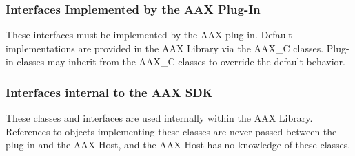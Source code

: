 \begin{DoxyRefList}
\item[Class \mbox{\hyperlink{a01869}{A\+A\+X\+\_\+\+I\+Property\+Map}} ]\label{a00844__aax_host_implementation000011}%
%
 
\item[Class \mbox{\hyperlink{a01885}{A\+A\+X\+\_\+\+I\+Transport}} ]\label{a00844__aax_host_implementation000012}%
%
 
\item[Class \mbox{\hyperlink{a01889}{A\+A\+X\+\_\+\+I\+View\+Container}} ]\label{a00844__aax_host_implementation000013}%
%

\end{DoxyRefList}\hypertarget{aax_plugin_implementation}{}\subsubsection{Interfaces Implemented by the A\+A\+X Plug-\/\+In}\label{aax_plugin_implementation}
These interfaces must be implemented by the A\+AX plug-\/in. Default implementations are provided in the A\+AX Library via the {\ttfamily A\+A\+X\+\_\+C} classes. Plug-\/in classes may inherit from the {\ttfamily A\+A\+X\+\_\+C} classes to override the default behavior.


\begin{DoxyRefList}
\item[Class \mbox{\hyperlink{a01817}{A\+A\+X\+\_\+\+I\+Effect\+Direct\+Data}} ]\label{a00844__aax_plugin_implementation000001}%
%
 
\item[Class \mbox{\hyperlink{a01821}{A\+A\+X\+\_\+\+I\+Effect\+G\+UI}} ]\label{a00844__aax_plugin_implementation000002}%
%
 
\item[Class \mbox{\hyperlink{a01825}{A\+A\+X\+\_\+\+I\+Effect\+Parameters}} ]\label{a00844__aax_plugin_implementation000003}%
%
 
\item[Class \mbox{\hyperlink{a01833}{A\+A\+X\+\_\+\+I\+Host\+Processor}} ]\label{a00844__aax_plugin_implementation000004}%
%

\end{DoxyRefList}\hypertarget{aax_sdk_internal}{}\subsubsection{Interfaces internal to the A\+A\+X S\+DK}\label{aax_sdk_internal}
These classes and interfaces are used internally within the A\+AX Library. References to objects implementing these classes are never passed between the plug-\/in and the A\+AX Host, and the A\+AX Host has no knowledge of these classes.


